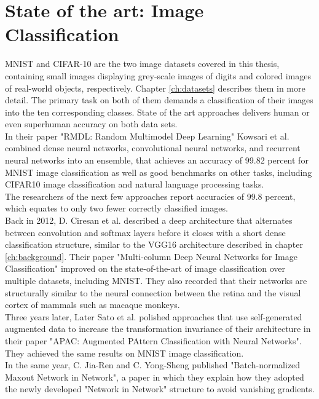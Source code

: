\section{State of the art: Image Classification}
MNIST and CIFAR-10 are the two image datasets covered in this thesis, containing small images displaying grey-scale images of digits and colored images of real-world objects, respectively. Chapter \ref{ch:datasets} describes them in more detail.
The primary task on both of them demands a classification of their images into the ten corresponding classes. State of the art approaches delivers human or even superhuman accuracy on both data sets.\\
In their paper "RMDL: Random Multimodel Deep Learning" Kowsari et al. combined dense neural networks, convolutional neural networks, and recurrent neural networks into an ensemble, that achieves an accuracy of 99.82 percent for MNIST image classification as well as good benchmarks on other tasks, including CIFAR10 image classification and natural language processing tasks.\cite{RMDL}\\
The researchers of the next few approaches report accuracies of 99.8 percent, which equates to only two fewer correctly classified images.\\
Back in 2012, D. Ciresan et al. described a deep architecture that alternates between convolution and softmax layers before it closes with a short dense classification structure, similar to the VGG16 architecture described in chapter \ref{ch:background}. Their paper "Multi-column Deep Neural Networks for Image Classification" improved on the state-of-the-art of image classification over multiple datasets, including MNIST. They also recorded that their networks are structurally similar to the neural connection between the retina and the visual cortex of mammals such as macaque monkeys.\cite{Multi-Column}\\
Three years later, Later Sato et al. polished approaches that use self-generated augmented data to increase the transformation invariance of their architecture in their paper "APAC: Augmented PAttern Classification with Neural Networks". They achieved the same results on MNIST image classification.\cite{APAC}\\
In the same year, C. Jia-Ren and C. Yong-Sheng published "Batch-normalized Maxout Network in Network", a paper in which they explain how they adopted the newly developed "Network in Network" structure to avoid vanishing gradients.\cite{Batch-Normalized}\\
